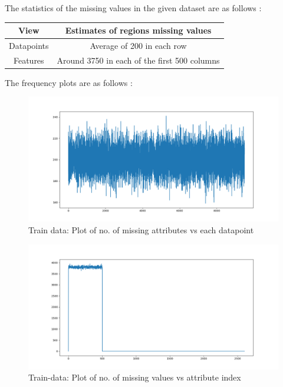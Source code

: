 \documentclass[12pt]{report}
\begin{document}
The statistics of the missing values in the given dataset are as follows :

\begin{table}[H]
\label{T:equipos}
\begin{center}
\begin{tabular}{| c | c |}
\hline
\textbf{View} & \textbf{Estimates of regions missing values}\\
\hline

Datapoints & Average of 200 in each row  \\ \hline
Features & Around 3750 in each of the first 500 columns \\ \hline

\end{tabular}
\end{center}
\end{table}

The frequency plots are as follows :

\begin{figure}[H]
  \centering
  \includegraphics[width=1\textwidth]{row_wise.png}
  \caption{Train data: Plot of no. of missing attributes vs each datapoint}
\end{figure}


\begin{figure}[H]
  \centering
  \includegraphics[width=1\textwidth]{col-wise.png}
  \caption{Train-data: Plot of no. of missing values vs attribute index}
\end{figure}
\end{document}
